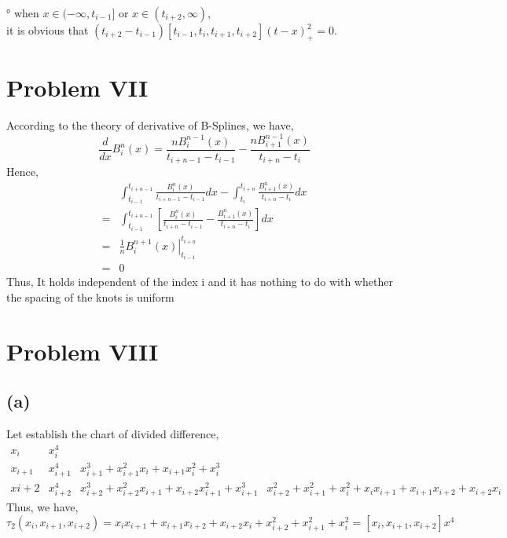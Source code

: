 \documentclass[UTF8]{ctexart}
\begin{document}
° when $x \in (-\infty, t_{i-1}]$ or $x \in (t_{i+2}, \infty)$,\\
it is obvious that $\left(t_{i+2}-t_{i-1}\right)\left[t_{i-1}, t_{i}, t_{i+1}, t_{i+2}\right](t-x)_{+}^{2}=0$.

\section*{Problem VII}
\noindent According to the theory of derivative of B-Splines, we have,
$$\frac{d}{d x} B_{i}^{n}(x)=\frac{n B_{i}^{n-1}(x)}{t_{i+n-1}-t_{i-1}}-\frac{n B_{i+1}^{n-1}(x)}{t_{i+n}-t_{i}}$$
Hence,
\begin{equation}
    \begin{aligned}
        & \int_{t_{i-1}}^{t_{i+n-1}} \frac{B_{i}^{n}(x)}{t_{i+n-1}-t_{i-1}} d x-\int_{t_{i}}^{t_{i+n}} \frac{B_{i+1}^{n}(x)}{t_{i+n}-t_{i}} d x \\
        =& \int_{t_{i-1}}^{t_{i+n-1}}\left[\frac{B_{i}^{n}(x)}{t_{i+n}-t_{i-1}}-\frac{B_{i+1}^{n}(x)}{t_{i+n}-t_{i}}\right] d x \\
        =&\left.\frac{1}{n} B_{i}^{n+1}(x)\right|_{t_{i-1}} ^{t_{i+n}} \\
        =& 0
    \nonumber
    \end{aligned}
\end{equation}
\noindent Thus, It holds independent of the index i and it has nothing to do with whether the spacing of the knots is uniform

\section*{Problem VIII}
\subsection*{(a)}
\noindent Let establish the chart of divided difference,
\begin{equation}
    \begin{array}{l|ccc}
    x_{i} & x_{i}^{4} & \\
    x_{i+1} & x_{i+1}^{4} & x_{i+1}^{3}+x_{i+1}^{2} x_{i}+x_{i+1} x_{i}^{2}+x_{i}^{3} \\
    x i+2 & x_{i+2}^{4} & x_{i+2}^{3}+x_{i+2}^{2} x_{i+1}+x_{i+2} x_{i+1}^{2}+x_{i+1}^{3} & x_{i+2}^{2}+x_{i+1}^{2}+x_{i}^{2}+x_{i} x_{i+1}+x_{i+1} x_{i+2}+x_{i+2} x_{i}
    \nonumber
    \end{array}
\end{equation}
Thus, we have,
$$\tau_{2}\left(x_{i}, x_{i+1}, x_{i+2}\right)=x_{i} x_{i+1}+x_{i+1} x_{i+2}+x_{i+2} x_{i}+x_{i+2}^{2}+x_{i+1}^{2}+x_{i}^{2}=\left[x_{i}, x_{i+1}, x_{i+2}\right] x^{4}$$
\end{document}

